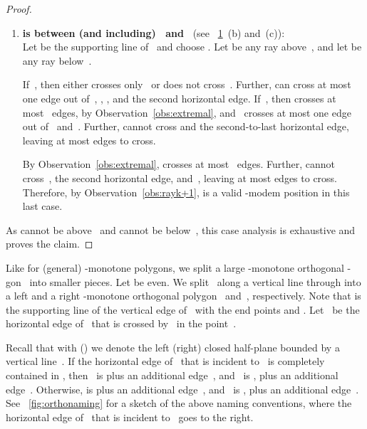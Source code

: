 \documentclass[A4]{article}
\begin{document}
\begin{proof}
\begin{enumerate}
By Observation~\ref{obs:extremal},  crosses at most~ edges.
Further,  cannot cross~, the second horizontal edge, and~, leaving at most  edges to cross.
Therefore, by Observation~\ref{obs:rayk+1},  is a valid \mbox{-modem} position in this case.

\begin{figure}[htb]
  \centering
  \texttt{[image: stairendproof]}
  \caption{Sketches for the proof of Lemma~\ref{lem:k+7}:
	  Case~ is below~ and~ is above~ (a).
      Case~ is between (and including)~ and~:
	   (b);
	   is between~ and~ (c).
    (The case where~ is not depicted.)}
  \label{fig:stairendproof4-5}
\end{figure}

\item \textbf{ is between (and including)~ and~} (see \figurename~\ref{fig:stairendproof4-5}~(b) and~(c)):\\
Let  be the supporting line of~ and choose .
Let  be any ray above~, and let  be any ray below~.

If~, then  either crosses only~ or does not cross~.
Further,  can cross at most one edge out of~, , , and the second horizontal edge.
If~, then  crosses at most~ edges, by Observation~\ref{obs:extremal}, and~ crosses at most one edge out of~ and~.
Further,  cannot cross  and the second-to-last horizontal edge, leaving at most  edges to cross.

By Observation~\ref{obs:extremal},  crosses at most~ edges.
Further,  cannot cross~, the second horizontal edge, and~, leaving at most  edges to cross.
Therefore, by Observation~\ref{obs:rayk+1},  is a valid \mbox{-modem} position in this last case.
\end{enumerate}

As  cannot be above~ and  cannot be below~, this case analysis is exhaustive and proves the claim.
\end{proof}


Like for (general) -monotone polygons, we split a large -monotone orthogonal -gon~ into smaller pieces.
Let  be even.
We split~ along a vertical line  through  into a left and a right -monotone orthogonal polygon~ and~, respectively.
Note that  is the supporting line of the vertical edge of~ with the end points  and .
Let~ be the horizontal edge of~ that is crossed by~ in the point~.


Recall that with  () we denote the left (right) closed half-plane bounded by a vertical line~.
If the horizontal edge of~ that is incident to~ is completely contained in , then~ is  plus an additional edge~, and~ is , plus an additional edge~.
Otherwise,  is  plus an additional edge~, and~ is , plus an additional edge~.
See \figurename~\ref{fig:orthonaming} for a sketch of the above naming conventions, where the horizontal edge of~ that is incident to~ goes to the right. 
\end{document}
